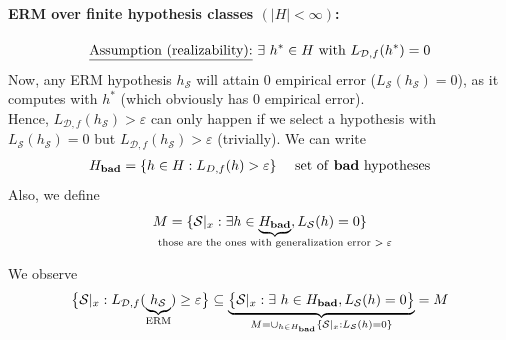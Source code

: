 \documentclass[10pt,a4paper]{article}
\theoremstyle{definition}
\theoremstyle{plain}
\begin{document}
\paragraph{ERM over finite hypothesis classes $(\big|H\big| < \infty)$:} 
$$\text{\underline{Assumption (realizability):} } \exists \ h^*\in H \text{ with } L_{\mathcal{D},f}(h^*) = 0$$
Now, any ERM hypothesis $h_\mathcal{S}$ will attain 0 empirical error ($L_\mathcal{S}(h_\mathcal{S}) = 0$), as it computes with $h^*$ (which obviously has 0 empirical error).\\
\newline
Hence, $L_{\mathcal{D},f}(h_\mathcal{S}) > \varepsilon$ can only happen if we select a hypothesis with $L_\mathcal{S}(h_\mathcal{S}) = 0$ but $L_{\mathcal{D},f}(h_\mathcal{S}) > \varepsilon$ (trivially). We can write
\begin{align*}
	H_\text{\textbf{bad}} = \{h \in H: L_{D,f}(h)>\varepsilon\} && \text{ set of \textbf{bad} hypotheses}
\end{align*}
Also, we define
$$
	M = \{\mathcal{S}|_x : \exists h \in \underbrace{H_{\mathrm{\textbf{bad}}}}_{\mathclap{\text{those are the ones with generalization error $> \varepsilon$}}}, L_\mathcal{S}(h) = 0  \}
$$

We observe
$$
\big\{\mathcal{S}|_x : L_{\mathcal{D},f}(\underbrace{h_\mathcal{S}}_{\mathclap{\text{ERM}}}) \geq \varepsilon\big\} \subseteq  \underbrace{\big\{\mathcal{S}|_x : \exists \ h \in H_{\mathrm{\textbf{bad}}}, L_\mathcal{S}(h) = 0 \big\}}_{\mathclap{M = \cup_{h \in H_{\mathrm{\textbf{bad}}}}\{\mathcal{S}|_x: L_{\mathcal{S}}(h) = 0\} }} = M
$$
\end{document}
